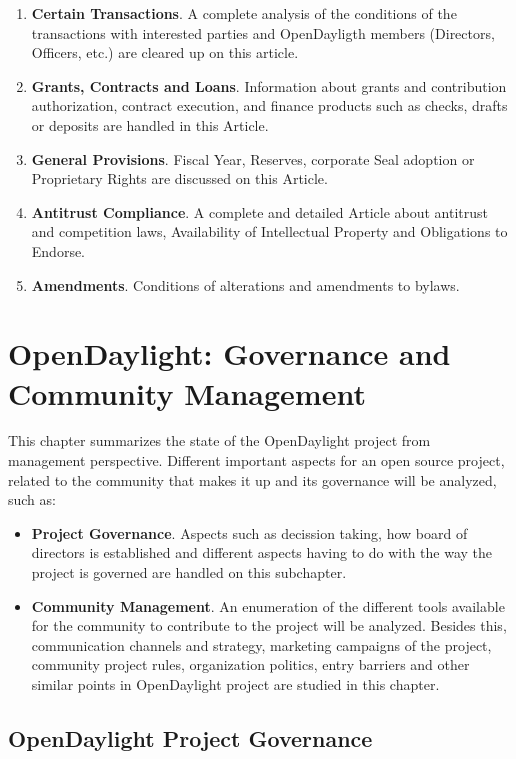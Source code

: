 \documentclass[a4paper, 12pt]{book}
\begin{document}
\begin{enumerate}
 \item{\textbf{Certain Transactions}}. A complete analysis of the conditions of the transactions with interested parties and OpenDayligth members (Directors, Officers, etc.) are cleared up on this article.
 \item{\textbf{Grants, Contracts and Loans}}. Information about grants and contribution authorization, contract execution, and finance products such as checks, drafts or deposits are handled in this Article.
 \item{\textbf{General Provisions}}. Fiscal Year, Reserves, corporate Seal adoption or Proprietary Rights are discussed on this Article.
 \item{\textbf{Antitrust Compliance}}. A complete and detailed Article about antitrust and competition laws, Availability of Intellectual Property and Obligations to Endorse.
 \item{\textbf{Amendments}}. Conditions of alterations and amendments to bylaws.
\end{enumerate}

\chapter{OpenDaylight: Governance and Community Management}
\label{chap:odlcommunity}

This chapter summarizes the state of the OpenDaylight project from management perspective. Different important aspects for an open source project, related to the community that makes it up and its governance will be analyzed, such as:
\begin{itemize}\itemsep0pt
\item{\textbf{Project Governance}}. Aspects such as decission taking, how board of directors is established and different aspects having to do with the way the project is governed are handled on this subchapter.
\item{\textbf{Community Management}}. An enumeration of the different tools available for the community to contribute to the project will be analyzed. Besides this, communication channels and strategy, marketing campaigns of the project, community project rules, organization politics, entry barriers and other similar points in OpenDaylight project are studied in this chapter.
\end{itemize}

\section{OpenDaylight Project Governance}
\label{sec:odlgovernance}
\end{document}
